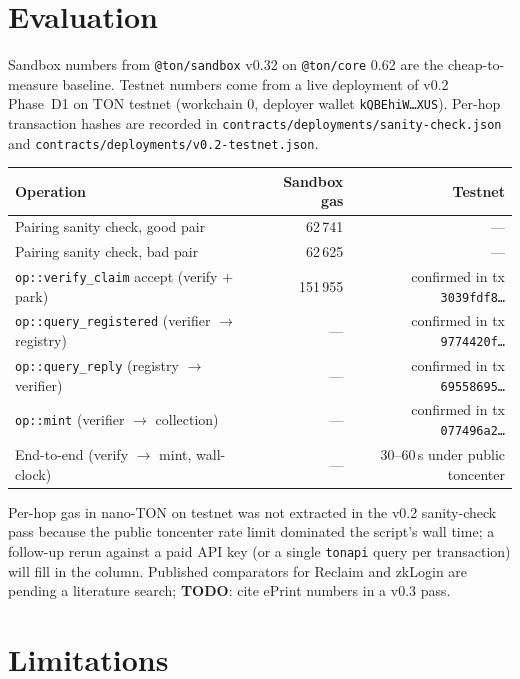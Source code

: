 \documentclass[11pt,a4paper]{article}
\begin{document}
\section{Evaluation}\label{sec:eval}

Sandbox numbers from \texttt{@ton/sandbox} v0.32 on \texttt{@ton/core}
0.62 are the cheap-to-measure baseline. Testnet numbers come from a
live deployment of v0.2 Phase~D1 on TON testnet (workchain 0,
deployer wallet \texttt{kQBEhiW…XUS}). Per-hop transaction hashes are
recorded in \texttt{contracts/deployments/sanity-check.json} and
\texttt{contracts/deployments/v0.2-testnet.json}.

\begin{center}
\begin{tabular}{lrr}
Operation & Sandbox gas & Testnet \\\hline
Pairing sanity check, good pair & 62\,741 & --- \\
Pairing sanity check, bad pair  & 62\,625 & --- \\
\texttt{op::verify\_claim} accept (verify + park) & 151\,955 & confirmed in tx \texttt{3039fdf8…} \\
\texttt{op::query\_registered} (verifier $\rightarrow$ registry) & --- & confirmed in tx \texttt{9774420f…} \\
\texttt{op::query\_reply}      (registry $\rightarrow$ verifier) & --- & confirmed in tx \texttt{69558695…} \\
\texttt{op::mint}              (verifier $\rightarrow$ collection) & --- & confirmed in tx \texttt{077496a2…} \\
End-to-end (verify $\rightarrow$ mint, wall-clock) & --- & 30--60\,s under public toncenter \\
\end{tabular}
\end{center}

Per-hop gas in nano-TON on testnet was not extracted in the v0.2
sanity-check pass because the public toncenter rate limit dominated
the script's wall time; a follow-up rerun against a paid API key (or
a single \texttt{tonapi} query per transaction) will fill in the
column. Published comparators for Reclaim and zkLogin are pending a
literature search; \textbf{TODO}: cite ePrint numbers in a v0.3 pass.

\section{Limitations}\label{sec:limits}
\end{document}
